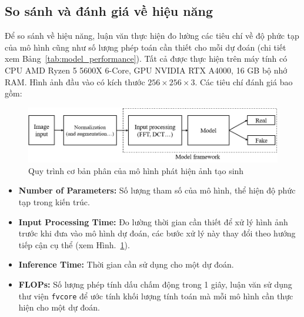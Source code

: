 \subsection{So sánh và đánh giá về hiệu năng}
%
%
Để so sánh về hiệu năng, luận văn thực hiện đo lường các tiêu chí về độ phức tạp của mô hình cũng như số lượng phép toán cần thiết cho mỗi dự đoán (chi tiết xem Bảng~\ref{tab:model_performance}). Tất cả được thực hiện trên máy tính có CPU AMD Ryzen 5 5600X 6-Core, GPU NVIDIA RTX A4000, 16 GB bộ nhớ RAM. Hình ảnh đầu vào có kích thước $256 \times 256 \times 3$. Các tiêu chí đánh giá bao gồm:
%
\begin{figure}[ht!]
	\includegraphics[width=\textwidth]{Images/figure_pine_line_1.png}
	\caption{Quy trình cơ bản phân của mô hình phát hiện ảnh tạo sinh}	
	\label{figure_pine_line_1}
\end{figure}
%
%
\begin{itemize}
	\item \textbf{Number of Parameters:} Số lượng tham số của mô hình, thể hiện độ phức tạp trong kiến trúc.
	\item \textbf{Input Processing Time:} Đo lường thời gian cần thiết để xử lý hình ảnh trước khi đưa vào mô hình dự đoán, các bước xử lý này thay đổi theo hướng tiếp cận cụ thể (xem Hình.~\ref{figure_pine_line_1}).
	\item \textbf{Inference Time:} Thời gian cần sử dụng cho một dự đoán.
	\item \textbf{FLOPs:} Số lượng phép tính dấu chấm động trong 1 giây, luận văn sử dụng thư viện \texttt{fvcore} để ước tính khối lượng tính toán mà mỗi mô hình cần thực hiện cho một dự đoán.
\end{itemize}
%
%





